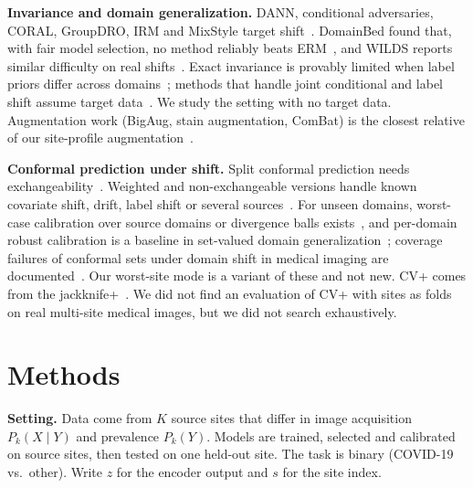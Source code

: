 \documentclass[10pt]{article}
\newcommand{\erm}{ERM}
\begin{document}
\textbf{Invariance and domain generalization.} DANN, conditional adversaries, CORAL, GroupDRO, IRM and MixStyle target shift~\cite{ganin2016domain,long2018conditional,sun2016deep,sagawa2020distributionally,arjovsky2019invariant,zhou2021domain}. DomainBed found that, with fair model selection, no method reliably beats \erm{}~\cite{gulrajani2021in}, and WILDS reports similar difficulty on real shifts~\cite{koh2021wilds}. Exact invariance is provably limited when label priors differ across domains~\cite{zhao2019learning}; methods that handle joint conditional and label shift assume target data~\cite{liu2021adversarial,lipton2018detecting}. We study the setting with no target data. Augmentation work (BigAug, stain augmentation, ComBat) is the closest relative of our site-profile augmentation~\cite{zhang2020generalizing,tellez2019quantifying,johnson2007adjusting}.

\textbf{Conformal prediction under shift.} Split conformal prediction needs exchangeability~\cite{vovk2005algorithmic,angelopoulos2023gentle}. Weighted and non-exchangeable versions handle known covariate shift, drift, label shift or several sources~\cite{tibshirani2019conformal,barber2023conformal,podkopaev2021distribution,liu2024multisource}. For unseen domains, worst-case calibration over source domains or divergence balls exists~\cite{zou2024coverage}, and per-domain robust calibration is a baseline in set-valued domain generalization~\cite{tsibulsky2025set}; coverage failures of conformal sets under domain shift in medical imaging are documented~\cite{mehrtens2025pitfalls}. Our worst-site mode is a variant of these and not new. CV+ comes from the jackknife+~\cite{barber2021predictive}. We did not find an evaluation of CV+ with sites as folds on real multi-site medical images, but we did not search exhaustively.

\section{Methods}
\textbf{Setting.} Data come from $K$ source sites that differ in image acquisition $P_k(X\mid Y)$ and prevalence $P_k(Y)$. Models are trained, selected and calibrated on source sites, then tested on one held-out site. The task is binary (COVID-19 vs.\ other). Write $z$ for the encoder output and $s$ for the site index.
\end{document}
